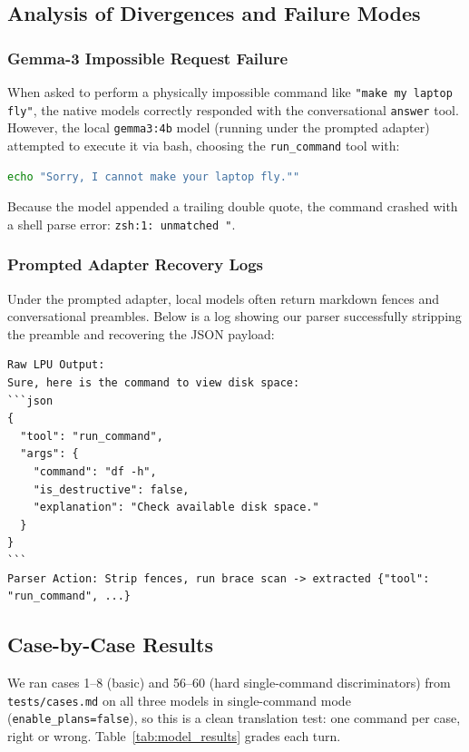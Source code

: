 \documentclass[11pt,a4paper]{article}
\begin{document}
\subsection{Analysis of Divergences and Failure Modes}

\subsubsection{Gemma-3 Impossible Request Failure}
When asked to perform a physically impossible command like \texttt{"make my laptop fly"}, the native models correctly responded with the conversational \texttt{answer} tool. However, the local \texttt{gemma3:4b} model (running under the prompted adapter) attempted to execute it via bash, choosing the \texttt{run\_command} tool with:
\begin{lstlisting}[language=bash]
echo "Sorry, I cannot make your laptop fly.""
\end{lstlisting}
Because the model appended a trailing double quote, the command crashed with a shell parse error: \texttt{zsh:1: unmatched "}.

\subsubsection{Prompted Adapter Recovery Logs}
Under the prompted adapter, local models often return markdown fences and conversational preambles. Below is a log showing our parser successfully stripping the preamble and recovering the JSON payload:
\begin{lstlisting}[caption={JSON de-fencing and brace-scanning recovery.}]
Raw LPU Output:
Sure, here is the command to view disk space:
```json
{
  "tool": "run_command",
  "args": {
    "command": "df -h",
    "is_destructive": false,
    "explanation": "Check available disk space."
  }
}
```
Parser Action: Strip fences, run brace scan -> extracted {"tool": "run_command", ...}
\end{lstlisting}

\subsection{Case-by-Case Results}
We ran cases 1--8 (basic) and 56--60 (hard single-command discriminators) from \texttt{tests/cases.md} on all three models in single-command mode (\texttt{enable\_plans=false}), so this is a clean translation test: one command per case, right or wrong. Table~\ref{tab:model_results} grades each turn.
\end{document}
